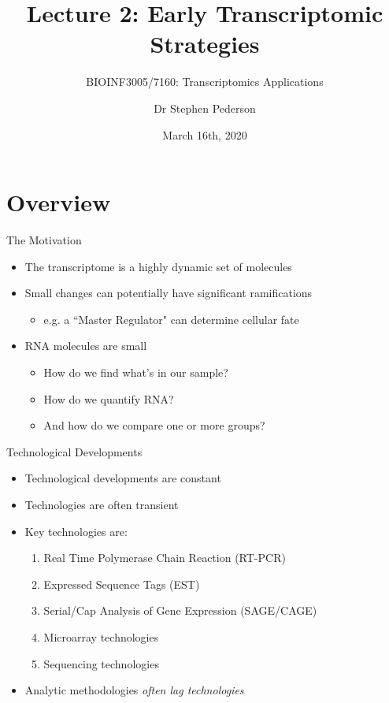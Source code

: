 \documentclass[aspectratio=169,11pt]{beamer}
\author{Dr Stephen Pederson}
\title{Lecture 2: Early Transcriptomic Strategies}
\subtitle{BIOINF3005/7160: Transcriptomics Applications}
\institute{Bioinformatics Hub, \\The University of Adelaide}
\date{March 16th, 2020}
\begin{document}
\begin{frame}
\titlepage
\end{frame}

\begin{frame}
\footnotesize
\tableofcontents
\end{frame}

\section{Overview}

\linespread{1.4}

\begin{frame}{The Motivation}

	\begin{itemize}
		\item The transcriptome is a highly dynamic set of molecules
		\item Small changes can potentially have significant ramifications
		\begin{itemize}
			\item e.g. a ``Master Regulator" can determine cellular fate
		\end{itemize}
		\item RNA molecules are small
		\begin{itemize}
			\item How do we find what's in our sample?
			\item How do we quantify RNA?
			\item And how do we compare one or more groups?
		\end{itemize}
	\end{itemize}

\end{frame}

\begin{frame}{Technological Developments}

	\begin{itemize}
		\item Technological developments are constant
		\item Technologies are often transient
		\item Key technologies are:
		\begin{enumerate}
			\item Real Time Polymerase Chain Reaction (RT-PCR)
			\item Expressed Sequence Tags (EST)
			\item Serial/Cap Analysis of Gene Expression (SAGE/CAGE)
			\item Microarray technologies
			\item Sequencing technologies
		\end{enumerate}
		\item Analytic methodologies \textit{often lag technologies}
	\end{itemize}

\end{frame}
\end{document}
